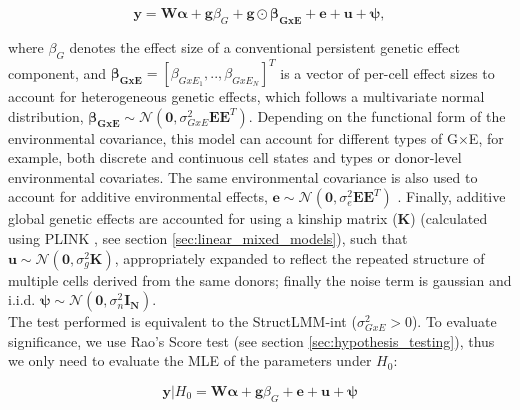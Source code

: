 \begin{equation}\label{eq:scStructLMM}
 \mathbf{y} =  \mathbf{W}\boldsymbol{\alpha} + \mathbf{g}\beta_G + \mathbf{g} \odot \boldsymbol{\beta_{GxE}} + \mathbf{e} + \mathbf{u} + \boldsymbol{\psi}, 
\end{equation}


where $\beta_G$ denotes the effect size of a conventional persistent genetic effect component, and $\boldsymbol{\beta_{GxE}}=[\beta_{GxE_1}, .. ,\beta_{GxE_N}]^T$ is a vector of per-cell effect sizes to account for heterogeneous genetic effects, which follows a multivariate normal distribution, $\boldsymbol{\beta_{GxE}} \sim \mathcal{N}(\mathbf{0},\sigma_{GxE}^2 \mathbf{E}\mathbf{E}^T)$. 
Depending on the functional form of the environmental covariance, this model can account for different types of G$\times$E, for example, both discrete and continuous cell states and types or donor-level environmental covariates. 
The same environmental covariance is also used to account for additive environmental effects, $\mathbf{e} \sim \mathcal{N}(\mathbf{0},\sigma_e^2 \mathbf{E}\mathbf{E}^T)$ \cite{moore2019linear}. 
Finally, additive global genetic effects are accounted for using a kinship matrix ($\mathbf{K}$) (calculated using PLINK \cite{purcell2007plink}, see section \ref{sec:linear_mixed_models}), such that
$\mathbf{u} \sim \mathcal{N}(\mathbf{0},\sigma_g^2 \mathbf{K})$,
appropriately expanded to reflect the repeated structure of multiple cells derived from the same donors; finally the noise term is gaussian and i.i.d. $\boldsymbol{\psi} \sim \mathcal{N}(\mathbf{0},\sigma_n^2 \mathbf{I_N})$.\\

The test performed is equivalent to the StructLMM-int ($\sigma_{GxE}^2 > 0$).
To evaluate significance, we 
use Rao's Score test (see section \ref{sec:hypothesis_testing}), thus we only need to evaluate the MLE of the parameters 
under $H_0$:

\begin{equation}\label{eq:scStructLMM_H0}
 \mathbf{y}|H_0 =  \mathbf{W}\boldsymbol{\alpha} + \mathbf{g}\beta_G + \mathbf{e} + \mathbf{u} + \boldsymbol{\psi} 
\end{equation}

